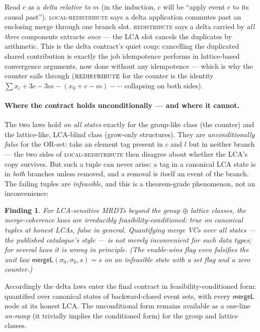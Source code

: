 \documentclass[11pt]{article}
\newtheorem*{finding}{Finding}
\newcommand{\mergeL}{\mathsf{mergeL}}
\newcommand{\Sinit}{\sigma_0}
\begin{document}
Read $c$ as a \emph{delta relative to $m$} (in the induction, $c$ will be
``apply event $e$ to its causal past''). \textsc{local-redistribute} says
a delta application commutes past an enclosing merge through one branch
slot. \textsc{redistribute} says a delta carried by \emph{all three}
components extracts \emph{once} --- the LCA slot cancels the duplicates by
arithmetic. This is the delta contract's quiet coup: cancelling the
duplicated shared contribution is exactly the job idempotence performs in
lattice-based convergence arguments, now done without any idempotence ---
which is why the
counter sails through ($\textsc{redistribute}$ for the counter is the
identity $\sum x_i + 3c - 3m - (x_0 + c - m) - \cdots$ collapsing on both
sides).

\paragraph{Where the contract holds unconditionally --- and where it
cannot.} The two laws hold \emph{on all states} exactly for the
group-like class (the counter) and the lattice-like, LCA-blind class
(grow-only structures). They are \emph{unconditionally false} for the
OR-set: take an element tag present in $c$ and $l$ but in neither branch
--- the two sides of \textsc{local-redistribute} then disagree about
whether the LCA's copy survives. But such a tuple can never arise: a tag
in a canonical LCA state is in \emph{both} branches unless removed, and a
removal is itself an event of the branch. The failing tuples are
\emph{infeasible}, and this is a theorem-grade phenomenon, not an
inconvenience:

\begin{finding}
For LCA-sensitive MRDTs beyond the group $\oplus$ lattice classes, the
merge-coherence laws are irreducibly \emph{feasibility-conditioned}: true
on canonical tuples at honest LCAs, false in general. Quantifying merge
VCs over all states --- the published catalogue's style --- is not merely
inconvenient for such data types; for several laws it is wrong in
principle. (The enable-wins flag even falsifies the \emph{unit} law
$\mergeL(\Sinit,\Sinit,s)=s$ on an infeasible state with a set flag and a
zero counter.)
\end{finding}

Accordingly the delta laws enter the final contract in
feasibility-conditioned form: quantified over canonical states of
backward-closed event sets, with every $\mergeL$ node at its honest LCA.
The unconditional form remains available as a one-line \emph{on-ramp} (it
trivially implies the conditioned form) for the group and lattice
classes.
\end{document}
